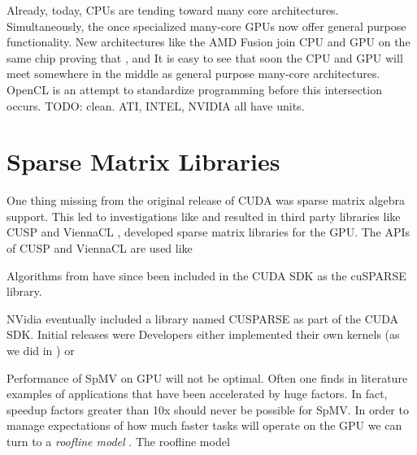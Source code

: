 \documentclass{report}
\begin{document}

 Already, today, CPUs are tending toward many core architectures. Simultaneously, the once specialized many-core GPUs now offer general purpose functionality. New architectures like the AMD Fusion \cite{AMDFusion} join CPU and GPU on the same chip proving that 
, and It is easy to see that soon the CPU and GPU will meet somewhere in the middle as general purpose many-core architectures. OpenCL is an attempt to standardize programming before this intersection occurs. 
TODO: clean. ATI, INTEL, NVIDIA all have units. 

\section{Sparse Matrix Libraries}

One thing missing from the original release of CUDA was sparse matrix algebra support. 
This led to investigations like \cite{Bell2009,SuKeutzer2012} and resulted in third party libraries like CUSP \cite{Cusp2012} and ViennaCL \cite{Rupp2010,Rupp2010a}, developed sparse matrix libraries for the GPU. The APIs of CUSP and ViennaCL are used like 

Algorithms from \cite{Bell2009} have since been included in the CUDA SDK as the cuSPARSE library. 

NVidia eventually included a library named CUSPARSE as part of the CUDA SDK. Initial releases were 
Developers either implemented their own kernels (as we did in \cite{BolligFlyerErlebacher2012}) or   



Performance of SpMV on GPU will not be optimal. Often one finds in literature examples of applications that have been accelerated by huge factors. In fact, speedup factors greater than 10x should never be possible for SpMV. In order to manage expectations of how much faster tasks will operate on the GPU we can turn to a \emph{roofline model} \cite{Williams2009}. The roofline model 


 
\end{document}
